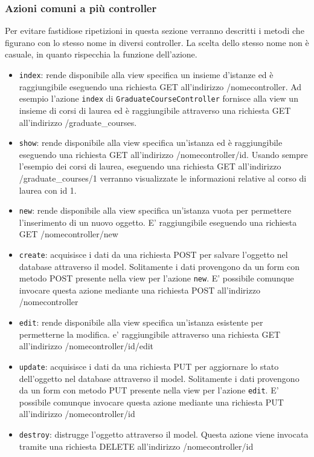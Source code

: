 \documentclass[11pt,a4paper]{article}
\begin{document}
\subsubsection{Azioni comuni a più controller}
Per evitare fastidiose ripetizioni in questa sezione verranno descritti i metodi che figurano con lo stesso nome in diversi controller. La scelta dello stesso nome non è casuale, in quanto rispecchia la funzione dell'azione.
\begin{itemize}
 \item \verb|index|: rende disponibile alla view specifica un insieme d'istanze ed è raggiungibile eseguendo una richiesta GET all'indirizzo /nomecontroller. Ad esempio l'azione \verb|index| di \verb|GraduateCourseController| fornisce alla view un insieme di corsi di laurea ed è raggiungibile attraverso una richiesta GET all'indirizzo /graduate\_courses.
 \item \verb|show|: rende disponibile alla view specifica un'istanza ed è raggiungibile eseguendo una richiesta GET all'indirizzo /nomecontroller/id. Usando sempre l'esempio dei corsi di laurea, eseguendo una richiesta GET all'indirizzo /graduate\_courses/1 verranno visualizzate le informazioni relative al corso di laurea con id 1.
 \item \verb|new|: rende disponibile alla view specifica un'istanza vuota per permettere l'inserimento di un nuovo oggetto. E' raggiungibile eseguendo una richiesta GET /nomecontroller/new
 \item \verb|create|: acquisisce i dati da una richiesta POST per salvare l'oggetto nel database attraverso il model. Solitamente i dati provengono da un form con metodo POST presente nella view per l'azione \verb|new|. E' possibile comunque invocare questa azione mediante una richiesta POST all'indirizzo /nomecontroller
 \item \verb|edit|: rende disponibile alla view specifica un'istanza esistente per permetterne la modifica. e' raggiungibile attraverso una richiesta GET all'indirizzo /nomecontroller/id/edit
 \item \verb|update|: acquisisce i dati da una richiesta PUT per aggiornare lo stato dell'oggetto nel database attraverso il model. Solitamente i dati provengono da un form con metodo PUT presente nella view per l'azione \verb|edit|. E' possibile comunque invocare questa azione mediante una richiesta PUT all'indirizzo /nomecontroller/id
 \item \verb|destroy|: distrugge l'oggetto attraverso il model. Questa azione viene invocata tramite una richiesta DELETE all'indirizzo /nomecontroller/id

\end{itemize}
\end{document}
